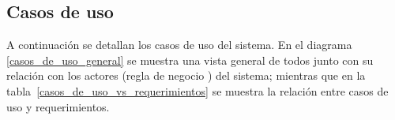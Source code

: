 %
%
%

\subsection{Casos de uso}

A continuación se detallan los casos de uso del sistema. En el diagrama
\ref{casos_de_uso_general} se muestra una vista general de todos junto con su
relación con los actores (regla de negocio )
del sistema; mientras que en la tabla~\ref{casos_de_uso_vs_requerimientos} se
muestra la relación entre casos de uso y requerimientos.

